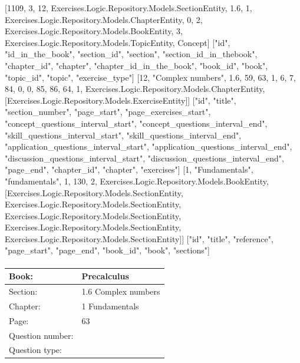 \documentclass{article}
\begin{document}
    [1109, 3, 12, Exercises.Logic.Repository.Models.SectionEntity, 1.6, 1, Exercises.Logic.Repository.Models.ChapterEntity, 0, 2, Exercises.Logic.Repository.Models.BookEntity, 3, Exercises.Logic.Repository.Models.TopicEntity, Concept]
    ["id", "id_in_the_book", "section_id", "section", "section_id_in_thebook", "chapter_id", "chapter", "chapter_id_in_the_book", "book_id", "book", "topic_id", "topic", "exercise_type"]
    [12, "Complex numbers", 1.6, 59, 63, 1, 6, 7, 84, 0, 0, 85, 86, 64, 1, Exercises.Logic.Repository.Models.ChapterEntity, [Exercises.Logic.Repository.Models.ExerciseEntity]]
    ["id", "title", "section_number", "page_start", "page_exercises_start", "concept_questions_interval_start", "concept_questions_interval_end", "skill_questions_interval_start", "skill_questions_interval_end", "application_questions_interval_start", "application_questions_interval_end", "discussion_questions_interval_start", "discussion_questions_interval_end", "page_end", "chapter_id", "chapter", "exercises"]
    [1, "Fundamentals", "fundamentals", 1, 130, 2, Exercises.Logic.Repository.Models.BookEntity, [Exercises.Logic.Repository.Models.SectionEntity, Exercises.Logic.Repository.Models.SectionEntity, Exercises.Logic.Repository.Models.SectionEntity, Exercises.Logic.Repository.Models.SectionEntity, Exercises.Logic.Repository.Models.SectionEntity]]
    ["id", "title", "reference", "page_start", "page_end", "book_id", "book", "sections"]

   \paragraph{}
   \begin{tabularx}{1\textwidth}{
           p{}
           p{}
       }
       \toprule
       Book: & Precalculus
       \\
       \midrule
       Section: & 1.6 Complex numbers
       \\
       \midrule
       Chapter: & 1 Fundamentals
       \\
       \midrule
       Page: & 63
       \\
       \midrule
       Question number: & 
       \\
       \midrule
       Question type: & 
       \\
       \bottomrule
   \end{tabularx}
\end{document}
